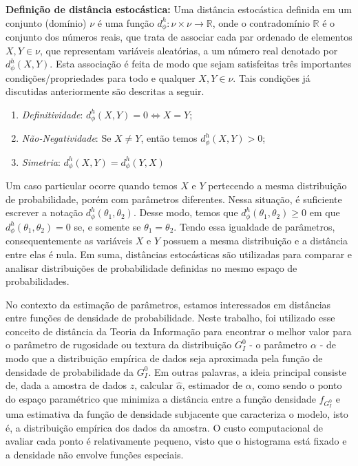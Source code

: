 \documentclass[12pt]{article}
\begin{document}
\textbf{Definição de distância estocástica:} Uma distância estocástica definida em um conjunto (domínio) $\nu$ é uma função $ d_\phi^h: \nu \times \nu \rightarrow \mathbb{R} $, onde o contradomínio $\mathbb{R}$ é o conjunto dos números reais, que trata de associar cada par ordenado de elementos $X, Y \in \nu$, que representam variáveis aleatórias, a um número real denotado por $d_\phi^h(X, Y)$. Esta associação é feita de modo que sejam satisfeitas três importantes condições/propriedades para todo e qualquer $X, Y \in \nu$. Tais condições já discutidas anteriormente são descritas a seguir.
\begin{enumerate}
    \item \textit{Definitividade}: $d_\phi^h(X, Y) = 0 \Leftrightarrow X = Y$;
    \item \textit{Não-Negatividade}: Se $X \neq Y$, então temos $d_\phi^h(X, Y) > 0$;
    \item \textit{Simetria}: $d_\phi^h(X, Y) = d_\phi^h(Y, X)$
\end{enumerate}
Um caso particular ocorre quando temos $X$ e $Y$ pertecendo a mesma distribuição de probabilidade, porém com parâmetros diferentes. Nessa situação, é suficiente escrever a notação $d_\phi^h(\theta_1, \theta_2)$. Desse modo, temos que $d_\phi^h(\theta_1, \theta_2) \geq 0$ em que $d_\phi^h(\theta_1, \theta_2) = 0$ se, e somente se $\theta_1 = \theta_2$. Tendo essa igualdade de parâmetros, consequentemente as variáveis $X$ e $Y$ possuem a mesma distribuição e a distância entre elas é nula. Em suma, distâncias estocásticas são utilizadas para comparar e analisar distribuições de probabilidade definidas no mesmo espaço de probabilidades.

No contexto da estimação de parâmetros, estamos interessados em distâncias entre funções de densidade de probabilidade. Neste trabalho, foi utilizado esse conceito de distância da Teoria da Informação para encontrar o melhor valor para o parâmetro de rugosidade ou textura da distribuição $G_I^0$ - o parâmetro $\alpha$ - de modo que a distribuição empírica de dados seja aproximada pela função de densidade de probabilidade da $G_I^0$. Em outras palavras, a ideia principal consiste de, dada a amostra de dados $z$, calcular $\hat{\alpha}$, estimador de $\alpha$, como sendo o ponto do espaço paramétrico que minimiza a distância entre a função densidade $f_{G_I^0}$ e uma estimativa da função de densidade subjacente que caracteriza o modelo, isto é, a distribuição empírica dos dados da amostra. O custo computacional de avaliar cada ponto é relativamente pequeno, visto que o histograma está fixado e a densidade não envolve funções especiais. 
\end{document}
